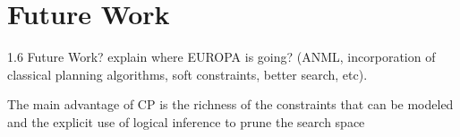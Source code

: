 \section{Future Work}
\label{sec:future}



1.6 Future Work?
explain where EUROPA is going? (ANML, incorporation of classical planning algorithms, soft constraints, better search, etc).

The main advantage of CP is the richness of the constraints that can be modeled and the explicit use of logical inference to prune the search space
